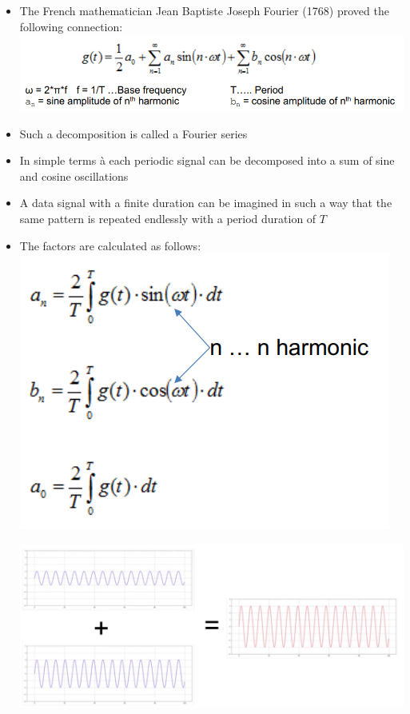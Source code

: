 \documentclass[11pt]{article}
\begin{document}
\begin{itemize}
    \item The French mathematician Jean Baptiste Joseph Fourier (1768) proved the following connection: \\
    \includegraphics[width=\textwidth]{fourier-analysis.png}
    \item Such a decomposition is called a Fourier series
    \item In simple terms à each periodic signal can be decomposed into a sum of sine and cosine oscillations
    \item A data signal with a finite duration can be imagined in such a way that the same pattern is repeated endlessly with a period duration of \( T \)
    \item The factors are calculated as follows: \\
    \includegraphics[width=\textwidth]{fourier-analysis-1.png}

    \includegraphics[width=\textwidth]{fourier-analysis-2.png}


\end{itemize}
\end{document}
